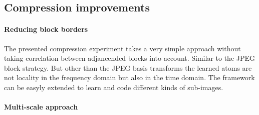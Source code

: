 \subsection{Compression improvements}

\paragraph{Reducing block borders} The presented compression experiment
takes a very simple approach without taking correlation between adjancended
blocks into account. Similar to the JPEG block strategy. But other than
the JPEG basis transforms the learned atoms are not locality in the frequency
domain but also in the time domain.
The framework can be easyly extended to learn and code different
kinds of sub-images.

\paragraph{Multi-scale approach}







